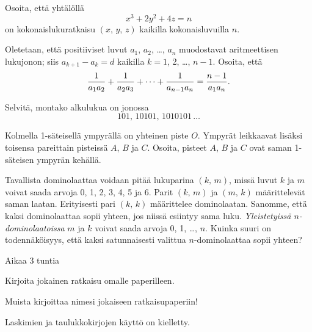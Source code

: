 

\let\prob=\harj



\bigbreak

\prob Osoita, ett\"a yht\"al\"oll\"a $$x^3+2y^2+4z=n$$ on
kokonaislukuratkaisu $(x,\,y,\,z)$ kaikilla kokonaisluvuilla $n$.

\prob Oletetaan, ett\"a positiiviset luvut $a_1$, $a_2$, \dots, $a_n$
muodostavat aritmeettisen lukujonon; siis $a_{k+1}-a_k=d$ kaikilla $k=1$, 2,
\dots, $n-1$. Osoita, ett\"a $${1\over a_1a_2}+{1\over a_2a_3}+\cdots+{1\over
a_{n-1}a_n}={n-1\over a_1a_n}.$$

\prob Selvit\"a, montako alkulukua on jonossa
$$101,\,10101,\,1010101\,\dots$$

\prob Kolmella 1-s\"ateisell\"a ympyr\"all\"a on yhteinen piste $O$.
Ympyr\"at leikkaavat lis\"aksi toisensa pareittain pisteiss\"a $A$, $B$ ja
$C$. Osoita, pisteet $A$, $B$ ja $C$ ovat saman 1-s\"ateisen ympyr\"an
keh\"all\"a. 

\prob Tavallista dominolaattaa voidaan pit\"a\"a lukuparina $(k,\,m)$,
miss\"a luvut $k$ ja $m$ voivat saada arvoja 0, 1, 2, 3, 4, 5 ja 6. Parit
$(k,\,m)$ ja $(m,\,k)$ m\"a\"arittelev\"at saman laatan. Erityisesti pari
$(k,\,k)$ m\"a\"arittelee dominolaatan. Sanomme, ett\"a kaksi dominolaattaa
sopii yhteen, jos niiss\"a esiintyy sama luku. {\it Yleistetyiss\"a 
$n$-dominolaatoissa\/} $m$ ja $k$ voivat saada arvoja 0, 1, \dots, $n$.
Kuinka suuri on todenn\"ak\"oisyys, ett\"a kaksi satunnaisesti valittua 
$n$-dominolaattaa sopii yhteen?

\vskip3cm

\noindent Aikaa 3 tuntia

\bigbreak

\noindent Kirjoita jokainen ratkaisu omalle paperilleen.

\noindent Muista kirjoittaa nimesi jokaiseen ratkaisupaperiin!

\noindent Laskimien ja taulukkokirjojen k\"aytt\"o on kielletty.

\bye



